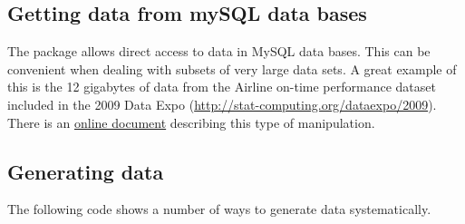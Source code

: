 \subsection{Getting data from mySQL data bases}

The  package allows direct access to data in MySQL data bases.
This can be convenient when dealing with subsets of very large data sets.
A great example of this is the 12 gigabytes of data from the Airline on-time
performance dataset included in the 2009 Data Expo (\url{http://stat-computing.org/dataexpo/2009}).
%
%
There is an \href{http://csg.sph.umich.edu/docs/R/rsql.html}{online document}
describing this type of manipulation. 


\subsection{Generating data}
\label{sec:generatingData}
%
%
%
%
%

The following code shows a number of ways to generate data systematically.

